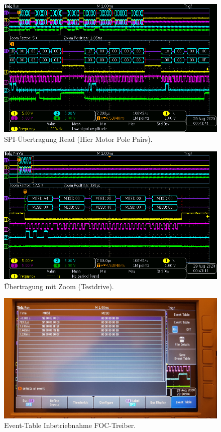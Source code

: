 \begin{figure}[H]
\center
\includegraphics[width = \textwidth]{graphics/TMC4671_Lesen_1}
\caption{SPI-Übertragung Read (Hier Motor Pole Pairs).}
\label{fig:TMC4671_Lesen_1}
\end{figure}

\newpage
\begin{figure}[H]
\center
\includegraphics[width = \textwidth]{graphics/TMC4671_TestDrive4}
\caption{Übertragung mit Zoom (Testdrive).}
\label{fig:TMC4671_TestDrive4}
\end{figure}

\begin{figure}[H]
\center
\includegraphics[width = \textwidth]{graphics/TMC4671_TimeTable_Beschreiben1_Bild}
\caption{Event-Table Inbetriebnahme FOC-Treiber.}
\label{fig:TMC4671_TimeTable_Beschreiben1_Bild}
\end{figure}

